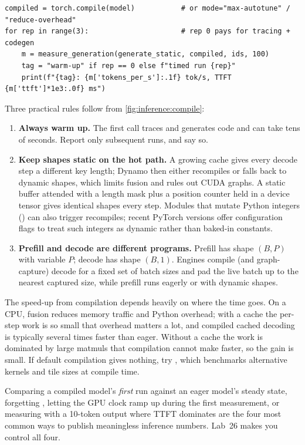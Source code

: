 \begin{lstlisting}[caption={Compiling and benchmarking with warm-up runs.},label={lst:inference:compile}]
compiled = torch.compile(model)           # or mode="max-autotune" / "reduce-overhead"
for rep in range(3):                      # rep 0 pays for tracing + codegen
    m = measure_generation(generate_static, compiled, ids, 100)
    tag = "warm-up" if rep == 0 else f"timed run {rep}"
    print(f"{tag}: {m['tokens_per_s']:.1f} tok/s, TTFT {m['ttft']*1e3:.0f} ms")
\end{lstlisting}

Three practical rules follow from \cref{fig:inference:compile}:
\begin{enumerate}
  \item \textbf{Always warm up.} The first call traces and generates code and can take tens of
    seconds. Report only subsequent runs, and say so.
  \item \textbf{Keep shapes static on the hot path.} A growing  cache gives every
    decode step a different key length; Dynamo then either recompiles or falls back to dynamic
    shapes, which limits fusion and rules out CUDA graphs. A static buffer attended with a length
    mask plus a position counter held in a device tensor gives identical shapes every step. Modules that mutate Python integers
    () can also trigger recompiles; recent PyTorch versions offer configuration
    flags to treat such integers as dynamic rather than baked-in constants.
  \item \textbf{Prefill and decode are different programs.} Prefill has shape $(B,P)$ with variable
    $P$; decode has shape $(B,1)$. Engines compile (and graph-capture) decode for a fixed set of
    batch sizes and pad the live batch up to the nearest captured size, while prefill runs eagerly
    or with dynamic shapes.
\end{enumerate}

The speed-up from compilation depends heavily on where the time goes. On a CPU, fusion reduces
memory traffic and Python overhead; with a cache the per-step work is so small that overhead
matters a lot, and compiled cached decoding is typically several times faster than eager. Without
a cache the work is dominated by large matmuls that compilation cannot make faster, so the gain is
small. If default compilation gives nothing, try , which benchmarks
alternative kernels and tile sizes at compile time.

\begin{pitfall}
Comparing a compiled model's \emph{first} run against an eager model's steady state, forgetting
, letting the GPU clock ramp up during the first measurement, or measuring
with a 10-token output where TTFT dominates are the four most common ways to publish meaningless
inference numbers. Lab~26 makes you control all four.
\end{pitfall}


